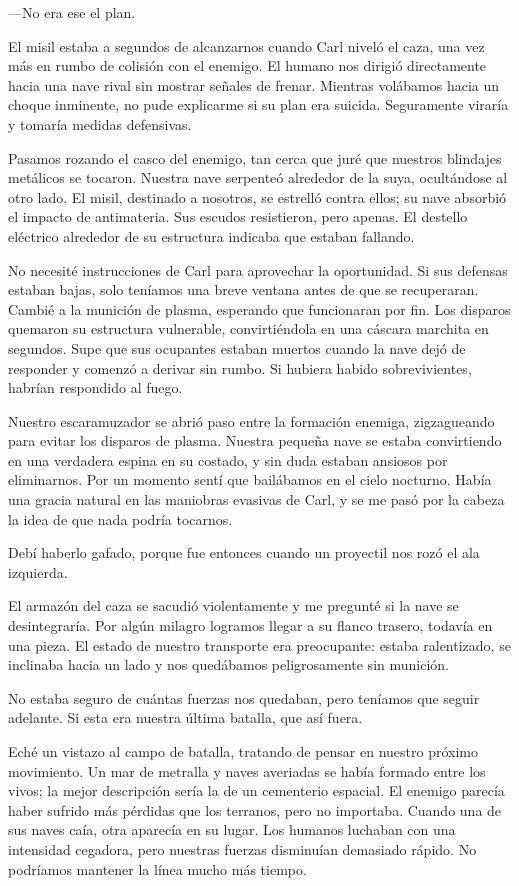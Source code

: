 —No era ese el plan.

El misil estaba a segundos de alcanzarnos cuando Carl niveló el caza, una vez más en rumbo de colisión con el enemigo. El humano nos dirigió directamente hacia una nave rival sin mostrar señales de frenar. Mientras volábamos hacia un choque inminente, no pude explicarme si su plan era suicida. Seguramente viraría y tomaría medidas defensivas.

Pasamos rozando el casco del enemigo, tan cerca que juré que nuestros blindajes metálicos se tocaron. Nuestra nave serpenteó alrededor de la suya, ocultándose al otro lado. El misil, destinado a nosotros, se estrelló contra ellos; su nave absorbió el impacto de antimateria. Sus escudos resistieron, pero apenas. El destello eléctrico alrededor de su estructura indicaba que estaban fallando.

No necesité instrucciones de Carl para aprovechar la oportunidad. Si sus defensas estaban bajas, solo teníamos una breve ventana antes de que se recuperaran. Cambié a la munición de plasma, esperando que funcionaran por fin. Los disparos quemaron su estructura vulnerable, convirtiéndola en una cáscara marchita en segundos. Supe que sus ocupantes estaban muertos cuando la nave dejó de responder y comenzó a derivar sin rumbo. Si hubiera habido sobrevivientes, habrían respondido al fuego.

Nuestro escaramuzador se abrió paso entre la formación enemiga, zigzagueando para evitar los disparos de plasma. Nuestra pequeña nave se estaba convirtiendo en una verdadera espina en su costado, y sin duda estaban ansiosos por eliminarnos. Por un momento sentí que bailábamos en el cielo nocturno. Había una gracia natural en las maniobras evasivas de Carl, y se me pasó por la cabeza la idea de que nada podría tocarnos.

Debí haberlo gafado, porque fue entonces cuando un proyectil nos rozó el ala izquierda.

El armazón del caza se sacudió violentamente y me pregunté si la nave se desintegraría. Por algún milagro logramos llegar a su flanco trasero, todavía en una pieza. El estado de nuestro transporte era preocupante: estaba ralentizado, se inclinaba hacia un lado y nos quedábamos peligrosamente sin munición.

No estaba seguro de cuántas fuerzas nos quedaban, pero teníamos que seguir adelante. Si esta era nuestra última batalla, que así fuera.

Eché un vistazo al campo de batalla, tratando de pensar en nuestro próximo movimiento. Un mar de metralla y naves averiadas se había formado entre los vivos; la mejor descripción sería la de un cementerio espacial. El enemigo parecía haber sufrido más pérdidas que los terranos, pero no importaba. Cuando una de sus naves caía, otra aparecía en su lugar. Los humanos luchaban con una intensidad cegadora, pero nuestras fuerzas disminuían demasiado rápido. No podríamos mantener la línea mucho más tiempo.

